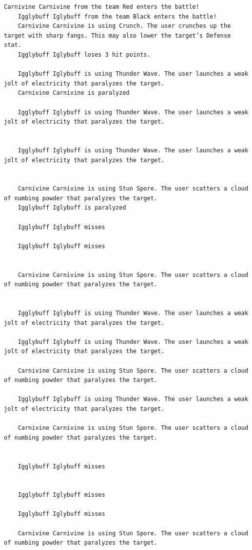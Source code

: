    \begin{lstlisting}[caption={Результат выполнения программы},label={lst:result}]
    Carnivine Carnivine from the team Red enters the battle!
    Igglybuff Iglybuff from the team Black enters the battle!
    Carnivine Carnivine is using Crunch. The user crunches up the target with sharp fangs. This may also lower the target’s Defense stat.
    Igglybuff Iglybuff loses 3 hit points.

    Igglybuff Iglybuff is using Thunder Wave. The user launches a weak jolt of electricity that paralyzes the target.
    Carnivine Carnivine is paralyzed

    Igglybuff Iglybuff is using Thunder Wave. The user launches a weak jolt of electricity that paralyzes the target.


    Igglybuff Iglybuff is using Thunder Wave. The user launches a weak jolt of electricity that paralyzes the target.


    Carnivine Carnivine is using Stun Spore. The user scatters a cloud of numbing powder that paralyzes the target.
    Igglybuff Iglybuff is paralyzed

    Igglybuff Iglybuff misses

    Igglybuff Iglybuff misses


    Carnivine Carnivine is using Stun Spore. The user scatters a cloud of numbing powder that paralyzes the target.


    Igglybuff Iglybuff is using Thunder Wave. The user launches a weak jolt of electricity that paralyzes the target.

    Igglybuff Iglybuff is using Thunder Wave. The user launches a weak jolt of electricity that paralyzes the target.

    Carnivine Carnivine is using Stun Spore. The user scatters a cloud of numbing powder that paralyzes the target.

    Igglybuff Iglybuff is using Thunder Wave. The user launches a weak jolt of electricity that paralyzes the target.

    Carnivine Carnivine is using Stun Spore. The user scatters a cloud of numbing powder that paralyzes the target.


    Igglybuff Iglybuff misses


    Igglybuff Iglybuff misses

    Igglybuff Iglybuff misses

    Carnivine Carnivine is using Stun Spore. The user scatters a cloud of numbing powder that paralyzes the target.


\end{lstlisting}
